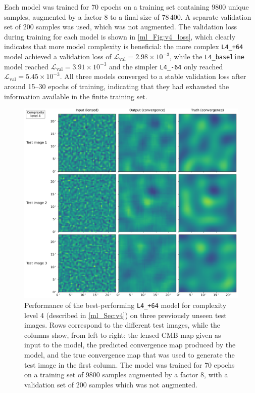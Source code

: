 Each model was trained for 70 epochs on a training set containing 9800 unique samples, augmented by a factor 8 to a final size of 78\,400. A separate validation set of 200 samples was used, which was not augmented. The validation loss during training for each model is shown in \autoref{ml_Fig:v4_loss}, which clearly indicates that more model complexity is beneficial: the more complex \texttt{L4\_+64} model achieved a validation loss of $\mathcal{L}_\text{val} = 2.98 \times 10^{-3}$, while the \texttt{L4\_baseline} model reached $\mathcal{L}_\text{val} = 3.91 \times 10^{-3}$ and the simpler \texttt{L4\_-64} only reached $\mathcal{L}_\text{val} = 5.45 \times 10^{-3}$. All three models converged to a stable validation loss after around 15--30 epochs of training, indicating that they had exhausted the information available in the finite training set.

\begin{figure}[tp]
\includegraphics[width=\textwidth]{v4_3x3}
\caption{Performance of the best-performing \texttt{L4\_+64} model for complexity level 4 (described in \autoref{ml_Sec:v4}) on three previously unseen test images. Rows correspond to the different test images, while the columns show, from left to right: the lensed CMB map given as input to the model, the predicted convergence map produced by the model, and the true convergence map that was used to generate the test image in the first column. The model was trained for 70 epochs on a training set of 9800 samples augmented by a factor 8, with a validation set of 200 samples which was not augmented.}
\label{ml_Fig:v4_3x3}
\end{figure}

